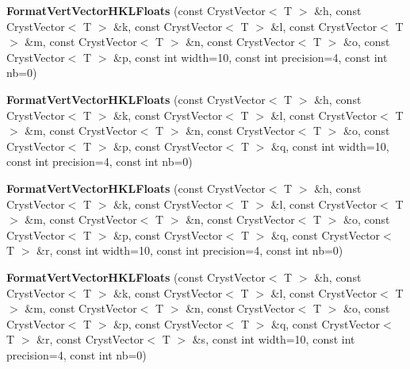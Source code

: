 \begin{DoxyCompactItemize}
\item 
\mbox{\label{class_format_vert_vector_h_k_l_floats_a191578194ceda7d78d5fcb66bac8c72a}} 
{\bfseries Format\+Vert\+Vector\+H\+K\+L\+Floats} (const Cryst\+Vector$<$ T $>$ \&h, const Cryst\+Vector$<$ T $>$ \&k, const Cryst\+Vector$<$ T $>$ \&l, const Cryst\+Vector$<$ T $>$ \&m, const Cryst\+Vector$<$ T $>$ \&n, const Cryst\+Vector$<$ T $>$ \&o, const Cryst\+Vector$<$ T $>$ \&p, const int width=10, const int precision=4, const int nb=0)
\item 
\mbox{\label{class_format_vert_vector_h_k_l_floats_a8bb6a4bf696b241374c62317d34e14a0}} 
{\bfseries Format\+Vert\+Vector\+H\+K\+L\+Floats} (const Cryst\+Vector$<$ T $>$ \&h, const Cryst\+Vector$<$ T $>$ \&k, const Cryst\+Vector$<$ T $>$ \&l, const Cryst\+Vector$<$ T $>$ \&m, const Cryst\+Vector$<$ T $>$ \&n, const Cryst\+Vector$<$ T $>$ \&o, const Cryst\+Vector$<$ T $>$ \&p, const Cryst\+Vector$<$ T $>$ \&q, const int width=10, const int precision=4, const int nb=0)
\item 
\mbox{\label{class_format_vert_vector_h_k_l_floats_a87e2593e52e37ef0d47d4536431791e4}} 
{\bfseries Format\+Vert\+Vector\+H\+K\+L\+Floats} (const Cryst\+Vector$<$ T $>$ \&h, const Cryst\+Vector$<$ T $>$ \&k, const Cryst\+Vector$<$ T $>$ \&l, const Cryst\+Vector$<$ T $>$ \&m, const Cryst\+Vector$<$ T $>$ \&n, const Cryst\+Vector$<$ T $>$ \&o, const Cryst\+Vector$<$ T $>$ \&p, const Cryst\+Vector$<$ T $>$ \&q, const Cryst\+Vector$<$ T $>$ \&r, const int width=10, const int precision=4, const int nb=0)
\item 
\mbox{\label{class_format_vert_vector_h_k_l_floats_a8a694789c3e1bba26881554245fb631e}} 
{\bfseries Format\+Vert\+Vector\+H\+K\+L\+Floats} (const Cryst\+Vector$<$ T $>$ \&h, const Cryst\+Vector$<$ T $>$ \&k, const Cryst\+Vector$<$ T $>$ \&l, const Cryst\+Vector$<$ T $>$ \&m, const Cryst\+Vector$<$ T $>$ \&n, const Cryst\+Vector$<$ T $>$ \&o, const Cryst\+Vector$<$ T $>$ \&p, const Cryst\+Vector$<$ T $>$ \&q, const Cryst\+Vector$<$ T $>$ \&r, const Cryst\+Vector$<$ T $>$ \&s, const int width=10, const int precision=4, const int nb=0)
\item 
\mbox{\label{class_format_vert_vector_h_k_l_floats_a9b31fac9a0b514f4bdd8d8f218655f52}} 

\end{DoxyCompactItemize}
